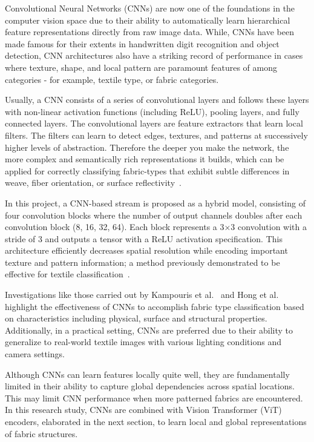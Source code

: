 Convolutional Neural Networks (CNNs) are now one of the foundations in the computer vision space due to their ability to automatically learn hierarchical feature representations directly from raw image data. While, CNNs have been made famous for their extents in handwritten digit recognition and object detection, CNN architectures also have a striking record of performance in cases where texture, shape, and local pattern are paramount features of among categories - for example, textile type, or fabric categories.

Usually, a CNN consists of a series of convolutional layers and follows these layers with non-linear activation functions (including ReLU), pooling layers, and fully connected layers. The convolutional layers are feature extractors that learn local filters. The filters can learn to detect edges, textures, and patterns at successively higher levels of abstraction. Therefore the deeper you make the network, the more complex and semantically rich representations it builds, which can be applied for correctly classifying fabric-types that exhibit subtle differences in weave, fiber orientation, or surface reflectivity~\cite{simonyan2015vgg, lecun1998gradient}.

In this project, a CNN-based stream is proposed as a hybrid model, consisting of four convolution blocks where the number of output channels doubles after each convolution block (8, 16, 32, 64). Each block represents a 3×3 convolution with a stride of 3 and outputs a tensor with a ReLU activation specification. This architecture efficiently decreases spatial resolution while encoding important texture and pattern information; a method previously demonstrated to be effective for textile classification~\cite{hong2024research}.

Investigations like those carried out by Kampouris et al.~\cite{kampouris2016fine} and Hong et al.~\cite{hong2024research} highlight the effectiveness of CNNs to accomplish fabric type classification based on characteristics including physical, surface and structural properties. Additionally, in a practical setting, CNNs are preferred due to their ability to generalize to real-world textile images with various lighting conditions and camera settings.

Although CNNs can learn features locally quite well, they are fundamentally limited in their ability to capture global dependencies across spatial locations. This may limit CNN performance when more patterned fabrics are encountered. In this research study, CNNs are combined with Vision Transformer (ViT) encoders, elaborated in the next section, to learn local and global representations of fabric structures.

